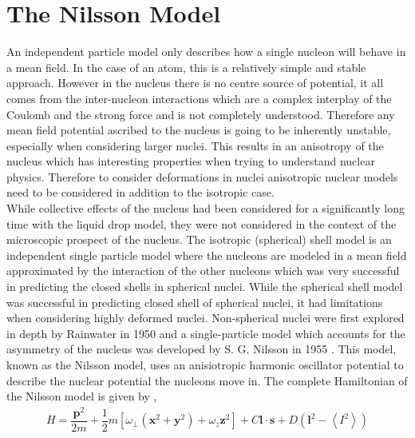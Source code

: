\documentclass[10pt,a4paper, twoside, openright]{report}
\begin{document}
\section{The Nilsson Model}
An independent particle model only describes how a single nucleon will behave in a mean field. In the case of an atom, this is a relatively simple and stable approach.  However in the nucleus there is no centre source of potential, it all comes from the inter-nucleon interactions which are a complex interplay of the Coulomb and the strong force and is not completely understood. Therefore any mean field potential ascribed to the nucleus is going to be inherently unstable, especially when considering larger nuclei. This results in an anisotropy of the nucleus which has interesting properties when trying to understand nuclear physics. Therefore to consider deformations in nuclei anisotropic nuclear models need to be considered in addition to the isotropic case. \\
\linebreak
While collective effects of the nucleus had been considered for a significantly long time with the liquid drop model, they were not considered in the context of the microscopic prospect of the nucleus\cite{Brix1986}. The isotropic (spherical) shell model is an independent single particle model where the nucleons are modeled in a mean field approximated by the interaction of the other nucleons which was very successful in predicting the closed shells in spherical nuclei\cite{Mayer1949, Jensen1949}. While the spherical shell model was successful in predicting closed shell of spherical nuclei, it had limitations when considering highly deformed nuclei. Non-spherical nuclei were first explored in depth by Rainwater in 1950 \cite{Rainwater1950} and a single-particle model which accounts for the asymmetry of the nucleus was developed by S. G. Nilsson in 1955 \cite{Nilsson1955}. This model, known as the Nilsson model, uses an anisiotropic harmonic oscillator potential to describe the nuclear potential the nucleons move in. The complete Hamiltonian of the Nilsson model is given by \cite{Nilsson1955, Gustafson1967},
\begin{align} \label{eq:NilssonHamiltonian}
H = \dfrac{\textbf{p}^2}{2m} + \dfrac{1}{2}m \left[\omega_{\perp}\left(\textbf{x}^2 + \textbf{y}^2\right) + \omega_z \textbf{z}^2\right] + C\textbf{l}\cdot \textbf{s} + D \left(\textbf{l}^2 - \left<I^2\right>\right)
\end{align}
\end{document}
